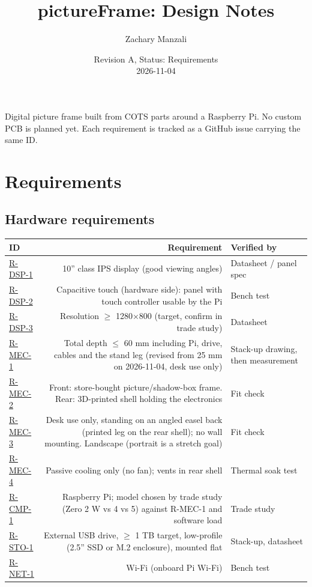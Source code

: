 \documentclass[11pt,a4paper]{article}
\title{pictureFrame: Design Notes}
\author{Zachary Manzali}
\date{Revision A, Status: Requirements \\ 2026-11-04}
\newcommand{\issue}[1]{\href{https://github.com/ZacharyManzali/pictureFrame/issues?q=#1}{#1}}
\begin{document}
\maketitle

Digital picture frame built from COTS parts around a Raspberry Pi. No custom PCB is planned yet.
Each requirement is tracked as a GitHub issue carrying the same ID.

\section{Requirements}

\subsection{Hardware requirements}
\begin{longtable}{l R V}
\toprule
\textbf{ID} & \textbf{Requirement} & \textbf{Verified by} \\
\midrule\endhead
\issue{R-DSP-1} & 10'' class IPS display (good viewing angles) & Datasheet / panel spec \\
\issue{R-DSP-2} & Capacitive touch (hardware side): panel with touch controller usable by the Pi & Bench test \\
\issue{R-DSP-3} & Resolution $\ge$ 1280$\times$800 (target, confirm in trade study) & Datasheet \\
\issue{R-MEC-1} & Total depth $\le$ 60 mm including Pi, drive, cables and the stand leg (revised from 25 mm on 2026-11-04, desk use only) & Stack-up drawing, then measurement \\
\issue{R-MEC-2} & Front: store-bought picture/shadow-box frame. Rear: 3D-printed shell holding the electronics & Fit check \\
\issue{R-MEC-3} & Desk use only, standing on an angled easel back (printed leg on the rear shell); no wall mounting. Landscape (portrait is a stretch goal) & Fit check \\
\issue{R-MEC-4} & Passive cooling only (no fan); vents in rear shell & Thermal soak test \\
\issue{R-CMP-1} & Raspberry Pi; model chosen by trade study (Zero 2 W vs 4 vs 5) against R-MEC-1 and software load & Trade study \\
\issue{R-STO-1} & External USB drive, $\ge$ 1 TB target, low-profile (2.5'' SSD or M.2 enclosure), mounted flat & Stack-up, datasheet \\
\issue{R-NET-1} & Wi-Fi (onboard Pi Wi-Fi) & Bench test \\

\end{longtable}
\end{document}
